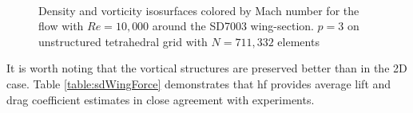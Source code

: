 \begin{figure}[htbp]
\centering
{}
\\

\caption{Density and vorticity isosurfaces colored by Mach number for the flow with $Re = 10,000$ around the SD7003 wing-section. $p=3$ on unstructured tetrahedral grid with $N = 711,332$ elements}
\label{sdwingre10k}
\end{figure}

It is worth noting that the vortical structures are preserved better than in the 2D case. Table \eqref{table:sdWingForce} demonstrates that \gls{hf} provides average lift and drag coefficient estimates in close agreement with experiments.


